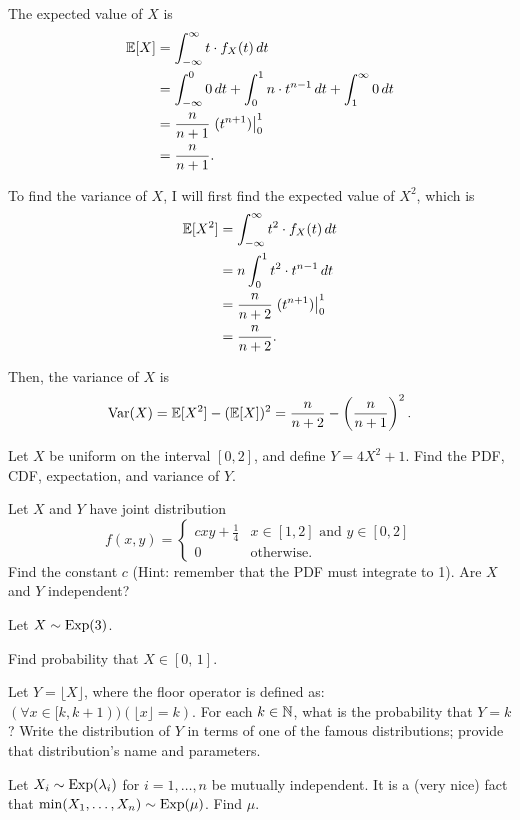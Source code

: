 \documentclass[11pt]{article}
\begin{document}
\begin{solution}
\begin{Parts}
\Part The expected value of $X$ is
\[
    \begin{split}
        \operatorname{\mathbb{E}}[X] &= \int_{-\infty}^{\infty} t \cdot f_X(t) \, dt \\
        &= \int_{-\infty}^{0} 0 \, dt + \int_{0}^{1} n \cdot t^{n-1} \, dt + \int_{1}^{\infty} 0 \, dt \\
        &= \frac{n}{n+1} \left. (t^{n+1}) \right|_0^1 \\
        &= \frac{n}{n+1}.
    \end{split}
\]

\Part To find the variance of $X$, I will first find the expected value of 
$X^2$, which is
\[
    \begin{split}
        \operatorname{\mathbb{E}}[X^2] &= \int_{-\infty}^{\infty} t^2 \cdot f_X(t) \, dt \\
        &= n \int_{0}^{1} t^2 \cdot t^{n-1}  \, dt \\
        &= \frac{n}{n+2} \left. (t^{n+1}) \right|_0^1 \\
        &= \frac{n}{n+2}.
    \end{split}
\]

Then, the variance of $X$ is
\[
    \operatorname{Var}(X) = \operatorname{\mathbb{E}}[X^2] - (\operatorname{\mathbb{E}}[X])^2 = \frac{n}{n+2} - \left( \frac{n}{n+1} \right)^2.
\]

\end{Parts}

\end{solution}


\begin{Parts}
    \Part Let $X$ be uniform on the interval $[0,2]$, and define $Y = 4X^2 + 1$. 
    Find the PDF, CDF, expectation, and variance of $Y$.

    \Part Let $X$ and $Y$ have joint distribution 
    \[
        f(x,y) = \begin{cases}
            c x y + \frac{1}{4} & \text{$x \in [1,2]$ and $y \in [0,2]$} \\
            0 & \text{otherwise.}
        \end{cases}
    \]
    Find the constant $c$ (Hint: remember that the PDF must integrate to 1). Are 
    $X$ and $Y$ independent?

    \Part Let $X \sim \operatorname{Exp}(3)$. 
    \begin{Parts}
    	\item Find probability that $X \in [0, \,1]$.
    	\item Let $Y = \lfloor X \rfloor$, where the floor operator is defined 
        as:  $(\forall x \in [k, k+1))(\lfloor x \rfloor = k)$. For each $k \in 
        \mathbb{N}$, what is the probability that $Y = k$? Write the distribution of $Y$ 
        in terms of one of the famous distributions; provide that distribution's 
        name and parameters.
    \end{Parts}

    \Part Let $X_i \sim \operatorname{Exp}(\lambda_i)$ for $i = 1,\ldots,n$ be mutually 
    independent. It is a (very nice) fact that $\min(X_1,\ldots,X_n) \sim 
    \operatorname{Exp}(\mu)$. Find $\mu$.
\end{Parts}
\end{document}
